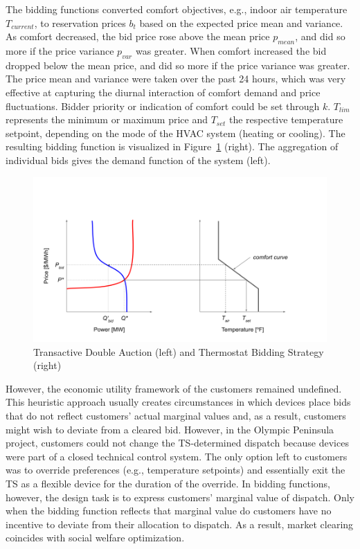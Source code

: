 \documentclass[12pt]{article}{Definitions/mdpi}
\begin{document}
The bidding functions converted comfort objectives, e.g., indoor air temperature $T_{current}$, to reservation prices $b_t$ based on the expected price mean and variance. As comfort decreased, the bid price rose above the mean price $p_{mean}$, and did so more if the price variance $p_{var}$ was greater. When comfort increased the bid dropped below the mean price, and did so more if the price variance was greater. The price mean and variance were taken over the past 24 hours, which was very effective at capturing the diurnal interaction of comfort demand and price fluctuations.
Bidder priority or indication of comfort could be set through $k$. $T_{lim}$ represents the minimum or maximum price and $ T_{set}$ the respective temperature setpoint, depending on the mode of the HVAC system (heating or cooling). 
The resulting bidding function is visualized in  Figure~\ref{fig:Transactive_DA} (right).
The aggregation of individual bids gives the demand function of the system (left).

\begin{figure}[t]
\centering
\includegraphics[scale=0.5]{images/TE_DA.png}
\caption{Transactive Double Auction (left) and Thermostat Bidding Strategy (right)}
\label{fig:Transactive_DA}
\end{figure}

However, the economic utility framework of the customers remained undefined. This heuristic approach usually creates circumstances in which devices place bids that do not reflect customers' actual marginal values and, as a result, customers might wish to deviate from a cleared bid. However, in the Olympic Peninsula project, customers could not change the TS-determined dispatch because devices were part of a closed technical control system. The only option left to customers was to override preferences (e.g., temperature setpoints) and essentially exit the TS as a flexible device for the duration of the override. In bidding functions, however, the design task is to express customers' marginal value of dispatch. Only when the bidding function reflects that marginal value do customers have no incentive to deviate from their allocation to dispatch. As a result, market clearing coincides with social welfare optimization. 
\end{document}
